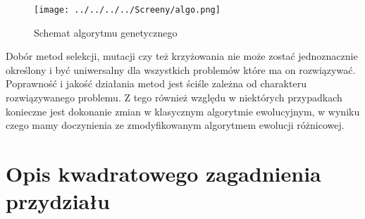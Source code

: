\begin{figure}[h!]
\begin{center}
		\texttt{[image: ../../../../Screeny/algo.png]}
		\caption{Schemat algorytmu genetycznego}
		\label{algo}		
\end{center}	
\end{figure}

Dobór metod selekcji, mutacji czy też krzyżowania nie może zostać jednoznacznie określony i być uniwersalny dla wszystkich problemów które ma on rozwiązywać. Poprawność i jakość działania metod jest ściśle zależna od charakteru rozwiązywanego problemu. Z tego również względu w niektórych przypadkach konieczne jest dokonanie zmian w klasycznym algorytmie ewolucyjnym, w wyniku czego mamy doczynienia ze zmodyfikowanym algorytmem ewolucji różnicowej.

\section{Opis kwadratowego zagadnienia przydziału}\label{sec:strukturaDokumentu}


